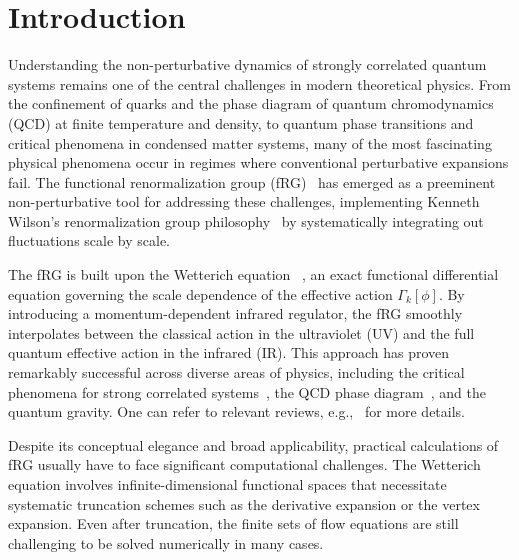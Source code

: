 \documentclass[reprint,twocolumn,superscriptaddress,preprintnumbers,amsmath,amssymb,aps,prd,floatfix]{revtex4-2}
\begin{document}
\maketitle

	


\section{Introduction}

Understanding the non-perturbative dynamics of strongly correlated quantum systems remains one of the central challenges in modern theoretical physics. From the confinement of quarks and the phase diagram of quantum chromodynamics (QCD) at finite temperature and density, to quantum phase transitions and critical phenomena in condensed matter systems, many of the most fascinating physical phenomena occur in regimes where conventional perturbative expansions fail. The functional renormalization group (fRG)~\cite{Wetterich:1992yh} has emerged as a preeminent non-perturbative tool for addressing these challenges, implementing Kenneth Wilson's renormalization group philosophy~\cite{Wilson:1971bg, Wilson:1971dh, Wilson:1971dc, Wilson:1973jj} by systematically integrating out fluctuations scale by scale.

The fRG is built upon the Wetterich equation~\cite{Wetterich:1992yh} , an exact functional differential equation governing the scale dependence of the effective action $\Gamma_k[\phi]$. By introducing a momentum-dependent infrared regulator, the fRG smoothly interpolates between the classical action in the ultraviolet (UV) and the full quantum effective action in the infrared (IR). This approach has proven remarkably successful across diverse areas of physics, including the critical phenomena for strong correlated systems~\cite{Berges:2000ew,Canet:2006xu, Canet:2011wf, Mesterhazy:2013naa, Bluhm:2018qkf, Roth:2023wbp, Tan:2024fuq, Chen:2024lzz, Roth:2024rbi, Roth:2024hcu}, the QCD phase diagram~\cite{Braun:2014ata, Mitter:2014wpa, Rennecke:2015eba, Cyrol:2016tym, Cyrol:2017qkl, Cyrol:2017ewj, Fu:2019hdw, Braun:2020ada,Ihssen:2024miv,Pawlowski:2025jpg}, and the quantum gravity. One can refer to relevant reviews, e.g.,~\cite{Berges:2000ew, Pawlowski:2005xe, Braun:2011pp, Dupuis:2020fhh, Fu:2022gou} for more details.

Despite its conceptual elegance and broad applicability, practical calculations of fRG usually have to face significant computational challenges. The Wetterich equation involves infinite-dimensional functional spaces that necessitate systematic truncation schemes such as the derivative expansion or the vertex expansion. Even after truncation, the finite sets of flow equations are still challenging to be solved numerically in many cases.
\end{document}
